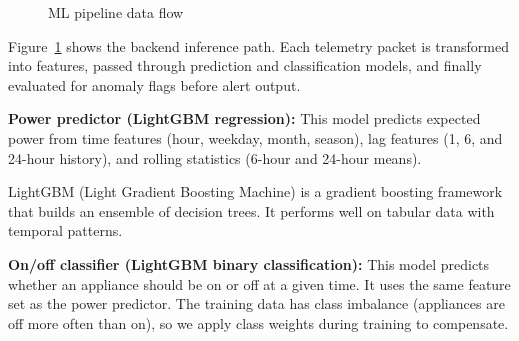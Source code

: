 \documentclass[12pt, a4paper]{article}
\numberwithin{figure}{section}
\numberwithin{table}{section}
\begin{document}
	\begin{figure}[H]
		\centering
		\caption{ML pipeline data flow}
		\label{fig:ml-pipeline}
	\end{figure}
	
	Figure~\ref{fig:ml-pipeline} shows the backend inference path. Each telemetry packet is transformed into features, passed through prediction and classification models, and finally evaluated for anomaly flags before alert output.
	
	\textbf{Power predictor (LightGBM regression):} This model predicts expected power from time features (hour, weekday, month, season), lag features (1, 6, and 24-hour history), and rolling statistics (6-hour and 24-hour means).
	
	LightGBM (Light Gradient Boosting Machine) is a gradient boosting framework that builds an ensemble of decision trees. It performs well on tabular data with temporal patterns.
	
	\textbf{On/off classifier (LightGBM binary classification):} This model predicts whether an appliance should be on or off at a given time. It uses the same feature set as the power predictor. The training data has class imbalance (appliances are off more often than on), so we apply class weights during training to compensate.
	
\end{document}
